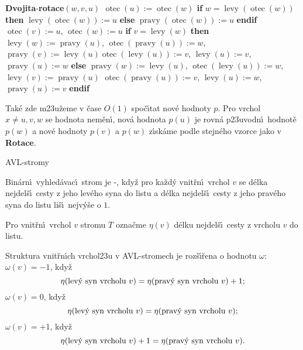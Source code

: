 \documentclass[a4paper,12pt]{article}
\def \emph#1{\underbar{#1}}
\DeclareMathOperator*{\otec}{otec}
\DeclareMathOperator*{\levy}{levy}
\DeclareMathOperator*{\pravy}{pravy}
\begin{document}
{\bf Dvojita}-{\bf rotace$(w,v,u)$\newline 
$\otec(u):=\otec(w)$\newline 
if} $w=\levy(\otec(w))$ {\bf then}\newline 
\phantom{---}$\levy(\otec(w)):=u$\newline 
{\bf else}\newline 
\phantom{---}$\pravy(\otec(w)):=u$\newline 
{\bf endif}\newline 
$\otec(v):=u$, $\otec(w):=u$\newline 
{\bf if} $v=\levy(w)$ {\bf then}\newline  
\phantom{---}$\levy(w):=\pravy(u)$, $\otec(\pravy(u)):=w$, $\pravy(v):=\levy(u)$\newline \phantom{---}$\otec(\levy(u)):=v$, $\levy(u):=v$, $\pravy(u):=w$\newline 
{\bf else}\newline 
\phantom{---}$\pravy(w):=\levy(u)$, $\otec(\levy(u)):=w$, $\levy(v):=\pravy(u)$\newline 
\phantom{---}$\otec(\pravy(u)):=v$, $\levy(u):=w$, $\pravy(u):=v$\newline 
{\bf endif}
\medskip

\flushpar Tak\'e zde m\accent23u\v zeme v \v case $O(1)$ spo\v c\'\i tat nov\'e hodnoty $
p$. 
Pro vrchol $x\ne u,v,w$ se hodnota nem\v en\'\i , nov\'a hodnota 
$p(u)$ je 
rovn\'a p\accent23uvodn\'\i\ hodnot\v e $p(w)$ a nov\'e hodnoty $
p(v)$ 
a $p(w)$ 
z\'\i sk\'ame pod\-le stejn\'eho vzorce  jako v {\bf Rotace}.

\heading
AVL-stromy
\endheading

\flushpar Bin\'arn\'\i\ vyhled\'avac\'\i\ strom je 
\emph{AVL}-\emph{strom}, kdy\v z pro ka\v zd\'y vnit\v r\-n\'\i\ vrchol 
$v$ se d\'elka nejdel\v s\'\i\ cesty z jeho lev\'eho syna do 
listu a d\'elka nejdel\v s\'\i\ cesty z jeho prav\'eho syna do listu 
li\v s\'\i\ nejv\'y\v se o $1$.  
\medskip

\flushpar Pro vnit\v rn\'\i\ vrchol $v$ stromu $T$ ozna\v cme $\eta 
(v)$ 
d\'elku nejdel\v s\'\i\ cesty z vrcholu $v$ do listu.
\medskip
 
\flushpar Struktura vnit\v rn\'\i ch vrchol\accent23u v 
AVL-stromech je roz\v s\'\i\v rena o hodnotu $\omega$:\newline 
$\omega (v)=-1$, kdy\v z 
$$\eta (\text{\rm lev\'y syn vrcholu }v)=\eta (\text{\rm prav\'y syn vrcholu }
v)+1;$$
$\omega (v)=0$, kdy\v z 
$$\eta (\text{\rm lev\'y syn vrcholu }v)=\eta (\text{\rm prav\'y syn vrcholu }
v);$$
$\omega (v)=+1$, kdy\v z
$$\eta (\text{\rm lev\'y syn vrcholu }v)+1=\eta (\text{\rm prav\'y syn vrcholu }
v).$$
\medskip
\end{document}

